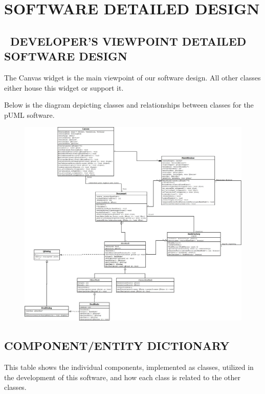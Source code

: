 \documentclass[twoside,letterpaper]{article}
\begin{document}
{\clearpage
\section{SOFTWARE DETAILED DESIGN}

\bigskip

\subsection[\ DEVELOPER{\textquoteright}S VIEWPOINT DETAILED SOFTWARE
DESIGN]{\foreignlanguage{english}{\ }\foreignlanguage{english}{DEVELOPER{\textquoteright}S
VIEWPOINT DETAILED SOFTWARE DESIGN}}

{\color{black}
The Canvas widget is the main viewpoint of our software design.  
All other classes either house this widget or support it.}

{\color{black}
Below is the diagram depicting classes and relationships between classes for the pUML software.}

\begin{figure}[h]
\centering
\includegraphics[width=6.5in]{class.jpg}
\end{figure}

\clearpage

\subsection[COMPONENT/ENTITY DICTIONARY]{\bfseries\color{black} COMPONENT/ENTITY DICTIONARY}
{\color{black}
This table shows the individual components, implemented as classes, utilized in the development of this software,
and how each class is related to the other classes.}

}
\end{document}

